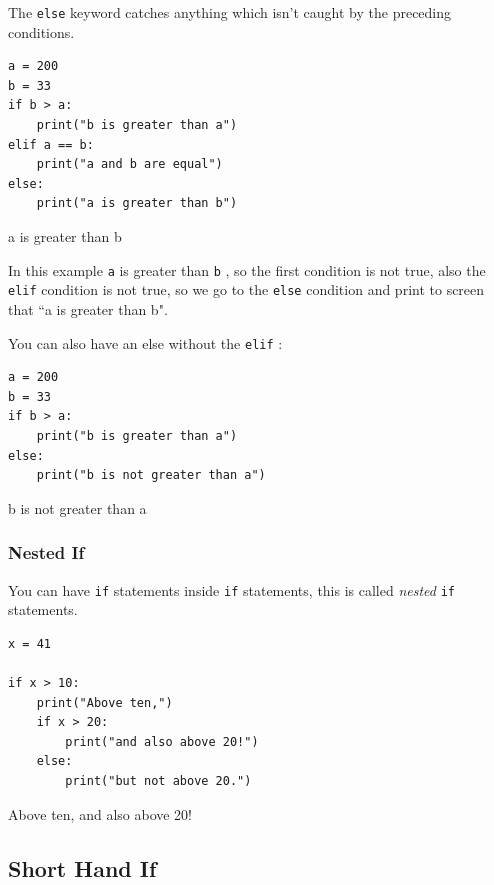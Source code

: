 \documentclass[12pt,a4paper]{article}
\newcommand{\code}[1]{%
	\colorbox{backcolour}{\lstinline{#1}}%
}
\begin{document}
The \code{else} keyword catches anything which isn't caught by the preceding conditions.

\begin{ebox}

	\begin{lstlisting}
a = 200
b = 33
if b > a:
    print("b is greater than a")
elif a == b:
    print("a and b are equal")
else:
    print("a is greater than b")
	\end{lstlisting}
\tcblower
	\begin{vercode}
a is greater than b
	\end{vercode}
\end{ebox}

In this example \code{a} is greater than \code{b}, so the first condition is
not true, also the \code{elif} condition is not true, so we go to the
\code{else} condition and print to screen that ``a is greater than b".

You can also have an else without the \code{elif}:

\begin{ebox}
	\begin{lstlisting}
a = 200
b = 33
if b > a:
    print("b is greater than a")
else:
    print("b is not greater than a")
	\end{lstlisting}
\tcblower
	\begin{vercode}
b is not greater than a
	\end{vercode}
\end{ebox}
\subsubsection{Nested If}

You can have \code{if} statements inside \code{if} statements, this is called
\textit{nested} \code{if} statements.

\begin{ebox}

	\begin{lstlisting}
x = 41

if x > 10:
    print("Above ten,")
    if x > 20:
        print("and also above 20!")
    else:
        print("but not above 20.")
	\end{lstlisting}
\tcblower
	\begin{vercode}
Above ten,
and also above 20!
	\end{vercode}
\end{ebox}
\subsection{Short Hand If}
\end{document}
